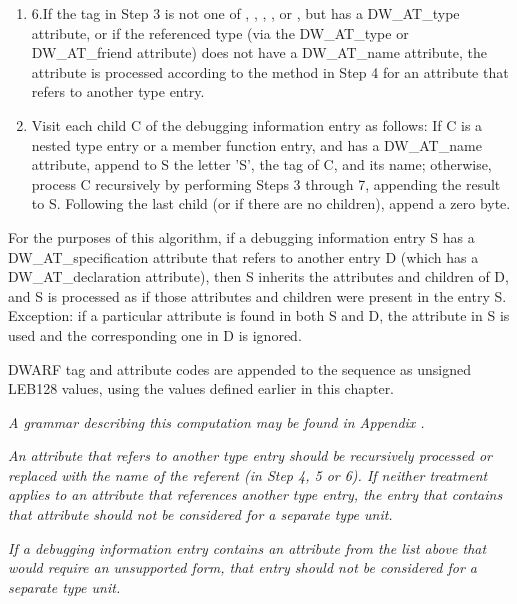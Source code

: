 \begin{enumerate}[1.]
\item 6.If the tag in Step 3 is not one of ,
, 
,
, or 
, but has
a DW\-\_AT\-\_type attribute, or if the referenced type (via
the DW\-\_AT\-\_type or 
DW\-\_AT\-\_friend attribute) does not have a
DW\-\_AT\-\_name attribute, the attribute is processed according to
the method in Step 4 for an attribute that refers to another
type entry.


\item Visit each child C of the debugging information
entry as follows: If C is a nested type entry or a member
function entry, and has a DW\-\_AT\-\_name attribute, append to
S the letter 'S', the tag of C, and its name; otherwise,
process C recursively by performing Steps 3 through 7,
appending the result to S. Following the last child (or if
there are no children), append a zero byte.
\end{enumerate}



For the purposes of this algorithm, if a debugging information
entry S has a 
DW\-\_AT\-\_specification 
attribute that refers to
another entry D (which has a 
DW\-\_AT\-\_declaration 
attribute),
then S inherits the attributes and children of D, and S is
processed as if those attributes and children were present in
the entry S. Exception: if a particular attribute is found in
both S and D, the attribute in S is used and the corresponding
one in D is ignored.

DWARF tag and attribute codes are appended to the sequence
as unsigned LEB128 values, using the values defined earlier
in this chapter.

\textit{A grammar describing this computation may be found in
Appendix .
}

\textit{An attribute that refers to another type entry should
be recursively processed or replaced with the name of the
referent (in Step 4, 5 or 6). If neither treatment applies to
an attribute that references another type entry, the entry
that contains that attribute should not be considered for a
separate type unit.}

\textit{If a debugging information entry contains an attribute from
the list above that would require an unsupported form, that
entry should not be considered for a separate type unit.}

